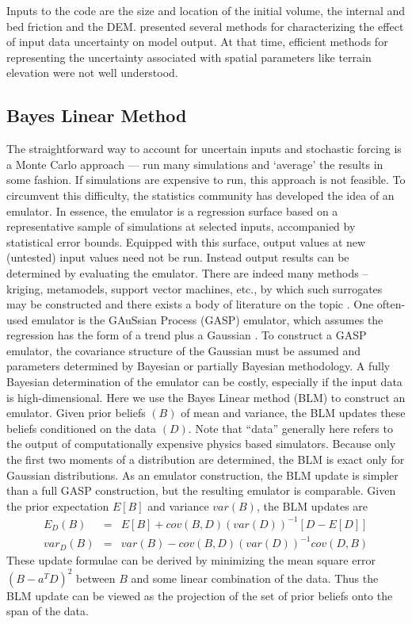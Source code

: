 \documentclass[12pt]{article}
\begin{document}
Inputs to the code are the size and location of the initial volume,
the internal and bed friction and the DEM. \citet{Keith} presented
several methods for characterizing the effect of input data
uncertainty on model output. At that time, efficient methods for
representing the uncertainty associated with spatial parameters like
terrain elevation were not well understood.

\subsection{Bayes Linear Method}

The straightforward way to account for uncertain inputs and stochastic
forcing is a Monte Carlo approach --- run many simulations and
`average' the results in some fashion. If simulations are expensive to
run, this approach is not feasible. To circumvent this difficulty, the
statistics community has developed the idea of an emulator.  In
essence, the emulator is a regression surface based on a
representative sample of simulations at selected inputs, accompanied
by statistical error bounds. Equipped with this surface, output values
at new (untested) input values need not be run.  Instead output
results can be determined by evaluating the emulator. There are indeed
many methods -- kriging, metamodels, support vector machines, etc., by
which such surrogates may be constructed and there exists a body of
literature on the topic \citep{simpson1,simpson2}.  One often-used
emulator is the GAuSsian Process (GASP) emulator, which assumes the
regression has the form of a trend plus a Gaussian
\citep{kennedy2001bcc, ContiOHagan, ohagan2006bac, bayarriusc}.  To
construct a GASP emulator, the covariance structure of the Gaussian
must be assumed and parameters determined by Bayesian or partially
Bayesian methodology.  A fully Bayesian determination of the emulator
can be costly, especially if the input data is high-dimensional.  Here
we use the Bayes Linear method (BLM) \citep{blm1tutor} to construct an
emulator. Given prior beliefs $(B)$ of mean and variance, the BLM
updates these beliefs conditioned on the data $(D)$.  Note that
``data'' generally here refers to the output of computationally
expensive physics based simulators.  Because only the first two
moments of a distribution are determined, the BLM is exact only for
Gaussian distributions.  As an emulator construction, the BLM update
is simpler than a full GASP construction, but the resulting emulator
is comparable.  Given the prior expectation $E[B]$ and variance
$var(B)$, the BLM updates are
\begin{eqnarray} \label{blupdate}
E_D(B) &=& E[B] + cov(B,D) (var(D))^{-1} [D-E[D]] \\ \nonumber
var_D(B) &=& var(B) - cov(B,D) (var(D))^{-1} cov(D,B)
\end{eqnarray}
These update formulae can be derived by minimizing the mean square
error $(B - a^T D)^2$ between $B$ and some linear combination of the
data. Thus the BLM update can be viewed as the projection of the set
of prior beliefs onto the span of the data.
\end{document}

